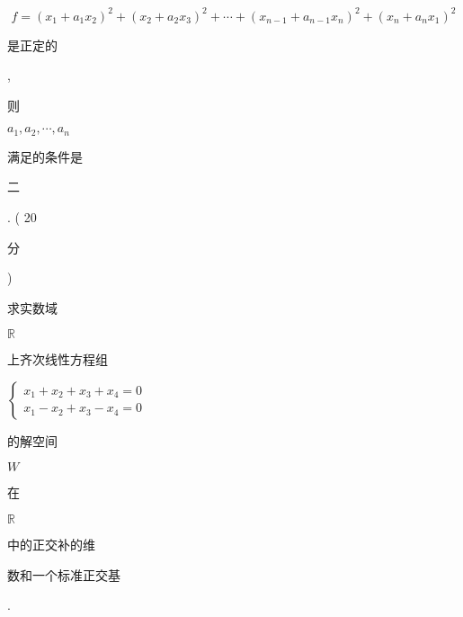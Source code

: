 \documentclass[10pt]{article}
\begin{document}
$$
f=\left(x_{1}+a_{1} x_{2}\right)^{2}+\left(x_{2}+a_{2} x_{3}\right)^{2}+\cdots+\left(x_{n-1}+a_{n-1} x_{n}\right)^{2}+\left(x_{n}+a_{n} x_{1}\right)^{2}
$$
\begin{CJK}{UTF8}{mj}是正定的\end{CJK}, \begin{CJK}{UTF8}{mj}则\end{CJK} $a_{1}, a_{2}, \cdots, a_{n}$ \begin{CJK}{UTF8}{mj}满足的条件是\end{CJK}

\begin{CJK}{UTF8}{mj}二\end{CJK}. ( 20 \begin{CJK}{UTF8}{mj}分\end{CJK}) \begin{CJK}{UTF8}{mj}求实数域\end{CJK} $\mathbb{R}$ \begin{CJK}{UTF8}{mj}上齐次线性方程组\end{CJK} $\left\{\begin{array}{l}x_{1}+x_{2}+x_{3}+x_{4}=0 \\ x_{1}-x_{2}+x_{3}-x_{4}=0\end{array}\right.$ \begin{CJK}{UTF8}{mj}的解空间\end{CJK} $W$ \begin{CJK}{UTF8}{mj}在\end{CJK} $\mathbb{R}$ \begin{CJK}{UTF8}{mj}中的正交补的维\end{CJK} \begin{CJK}{UTF8}{mj}数和一个标准正交基\end{CJK}.
\end{document}
